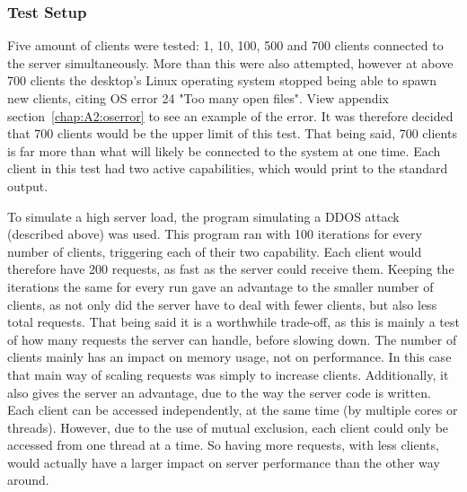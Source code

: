 \subsubsection{Test Setup}
Five amount of clients were tested: 1, 10, 100, 500 and 700 clients connected to the server simultaneously. More than this were also attempted, however at above 700 clients the desktop's Linux operating system stopped being able to spawn new clients, citing OS error 24 "Too many open files". View appendix section~\ref{chap:A2:oserror} to see an example of the error. It was therefore decided that 700 clients would be the upper limit of this test. That being said, 700 clients is far more than what will likely be connected to the system at one time. Each client in this test had two active capabilities, which would print to the standard output.

To simulate a high server load, the program simulating a DDOS attack (described above) was used. This program ran with 100 iterations for every number of clients, triggering each of their two capability. Each client would therefore have 200 requests, as fast as the server could receive them. Keeping the iterations the same for every run gave an advantage to the smaller number of clients, as not only did the server have to deal with fewer clients, but also less total requests. That being said it is a worthwhile trade-off, as this is mainly a test of how many requests the server can handle, before slowing down. The number of clients mainly has an impact on memory usage, not on performance. In this case that main way of scaling requests was simply to increase clients. Additionally, it also gives the server an advantage, due to the way the server code is written. Each client can be accessed independently, at the same time (by multiple cores or threads). However, due to the use of mutual exclusion, each client could only be accessed from one thread at a time. So having more requests, with less clients, would actually have a larger impact on server performance than the other way around.

